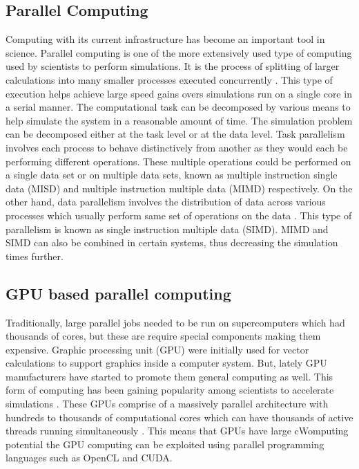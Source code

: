 \documentclass[preprint,10pt,authoryear,review]{elsarticle}
\begin{document}
\begin{linenumbers}
\subsection{Parallel Computing}
Computing with its current infrastructure has become an important tool in science. 
Parallel computing is one of the more extensively used type of computing used by scientists 
to perform simulations. It is the process of splitting of larger calculations into 
many smaller processes executed concurrently \citep{Almasi1989}. This type of execution 
helps achieve large speed gains overs simulations run on a single core in a serial manner.
The computational task can be decomposed by various means to help simulate the system 
in a reasonable amount of time. The simulation problem can be decomposed either 
at the task level or at the data level. Task parallelism involves each process to 
behave distinctively from another as they would each be performing different operations. 
These multiple operations could be performed on a single data set or on multiple data 
sets, known as multiple instruction single data (MISD) and multiple instruction 
multiple data (MIMD) respectively. On the other hand, data parallelism 
involves the distribution of data across various processes which usually perform same set of 
operations on the data \citep{solihin2015}. This type of parallelism is known 
as single instruction multiple data (SIMD). MIMD and SIMD can also 
be combined in certain systems, thus decreasing the simulation times further.

\subsection{GPU based parallel computing}
Traditionally, large parallel jobs needed to be run on supercomputers which had thousands 
of cores, but these are require special components making them expensive.
Graphic processing unit (GPU) were initially used for vector calculations to support 
graphics inside a computer system. But, lately GPU manufacturers have started to promote them 
general computing as well. This form of computing has been gaining popularity among scientists 
to accelerate simulations \citep{kandrot2011}. These GPUs comprise of a 
massively parallel architecture with hundreds to thousands of computational cores 
which can have thousands of active threads running simultaneously \citep{keckler2011}. 
This means that GPUs have large cWomputing potential the GPU computing can be exploited using parallel programming languages 
such as OpenCL and CUDA. 


\end{linenumbers}
\end{document}
